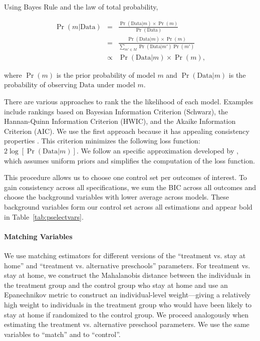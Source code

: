 \pagebreak
\noindent Using Bayes Rule and the law of total probability,

\begin{eqnarray}
\Pr( m | \text{Data} ) &=& \frac{\Pr(\text{Data} | m)\times \Pr(m)}{ \Pr(\text{Data})}\\ \nonumber
&=& \frac{\Pr(\text{Data} | m)\times \Pr(m)}{\sum \limits _{m' \in M} \Pr (\text{Data} | m') \Pr(m')} \\ \nonumber
&\propto& \Pr (\text{Data} | m) \times \Pr(m),
\end{eqnarray}

\noindent where $\Pr(m)$ is the prior probability of model $m$ and $\Pr(\text{Data} | m)$ is the probability of observing $\text{Data}$ under model $m$.

\noindent There are various approaches to rank the the likelihood of each model. Examples include rankings based on Bayesian Information Criterion (Schwarz), the Hannan-Quinn Information Criterion (HWIC), and the Akaike Information Criterion (AIC). We use the first approach because it has appealing consistency properties \citep{Diebold_2007_Forecasting}. This criterion minimizes the following loss function: $2 \log [\Pr( \text{Data} | m)]$. We follow an specific approximation developed by \citet{Claeskens-Hjort_2008_Model-Selection}, which assumes uniform priors and simplifies the computation of the loss function.

\noindent This procedure allows us to choose one control set per outcomes of interest. To gain consistency across all specifications, we sum the BIC across all outcomes and choose the background variables with lower average across models. These background variables form our control set across all estimations and appear bold in Table~\ref{tab:pselectvars}.

\paragraph{Matching Variables}\label{app:matching-is-fun}

\noindent We use matching estimators for different versions of the ``treatment vs. stay at home'' and ``treatment vs. alternative preschools'' parameters. For treatment vs. stay at home, we construct the Mahalanobis distance between the individuals in the treatment group and the control group who stay at home and use an Epanechnikov metric to construct an individual-level weight---giving a relatively high weight to individuals in the treatment group who would have been likely to stay at home if randomized to the control group. We proceed analogously when estimating the treatment vs. alternative preschool parameters. We use the same variables to ``match'' and to ``control''.


